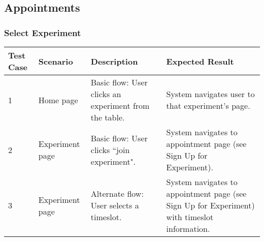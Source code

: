 \subsection{Appointments}
\subsubsection{Select Experiment}
\begin{table}[!h]
    \begin{tabular}{|l|l|l|l|}
        \hline
        Test Case & Scenario & Description & Expected Result \\
        \hline
        1 & Home page & Basic flow: User clicks an experiment from the table. & System navigates user to that experiment's page. \\
        \hline
        2 & Experiment page & Basic flow: User clicks ``join experiment". & System navigates to appointment page (see Sign Up for Experiment). \\
        \hline
        3 & Experiment page & Alternate flow: User selects a timeslot. & System navigates to appointment page (see Sign Up for Experiment) with timeslot information. \\
        \hline
    \end{tabular}
\end{table}

